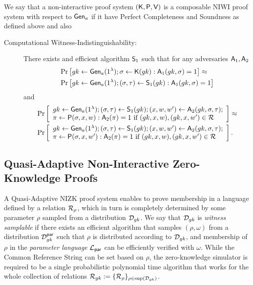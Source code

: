 \begin{definition} We say that a non-interactive proof system $(\mathsf{K},\mathsf{P},\mathsf{V})$ is a composable NIWI proof system with respect to $\mathsf{Gen}_a$ if it have Perfect Completeness and Soundness as defined above and also
\begin{description}
\item[Computational Witness-Indistinguishability:] There exists and efficient algorithm $\mathsf{S}_1$ such that for any adversaries $\mathsf{A}_1,\mathsf{A}_2$
\begin{align*}
&\Pr\left[
gk\gets\mathsf{Gen}_a(1^\lambda);\sigma\gets\mathsf{K}(gk):
\mathsf{A}_1(gk,\sigma)=1
\right]\approx\\
&\Pr\left[
gk\gets\mathsf{Gen}_a(1^\lambda);(\sigma,\tau)\gets\mathsf{S}_1(gk):
\mathsf{A}_1(gk,\sigma)=1
\right]
\end{align*}
and
\begin{align*}
&\Pr\left[
\begin{array}{l}
gk\gets\mathsf{Gen}_a(1^\lambda);(\sigma,\tau)\gets\mathsf{S}_1(gk);(x,w,w')\gets\mathsf{A}_2(gk,\sigma,\tau);\\
\pi\gets\mathsf{P}(\sigma,x,w):\mathsf{A}_2(\pi)=1\text{ if }(gk,x,w),(gk,x,w')\in\mathcal{R}
\end{array}
\right]\approx\\
&\Pr\left[
\begin{array}{l}
gk\gets\mathsf{Gen}_a(1^\lambda);(\sigma,\tau)\gets\mathsf{S}_1(gk);(x,w,w')\gets\mathsf{A}_2(gk,\sigma,\tau);\\
\pi\gets\mathsf{P}(\sigma,x,w'):\mathsf{A}_2(\pi)=1\text{ if }(gk,x,w),(gk,x,w')\in\mathcal{R}
\end{array}
\right].
\end{align*}
\end{description}
\end{definition}

\subsection{Quasi-Adaptive Non-Interactive Zero-Knowledge Proofs}
A Quasi-Adaptive NIZK proof system \cite{AC:JutRoy13} enables
to prove membership in a language defined by a relation $\mathcal{R}_\rho$, which in turn is completely determined by some parameter
$\rho$ sampled from a distribution $\mathcal{D}_{gk}$.
We say that $\mathcal{D}_{gk}$ is \emph{witness samplable} if there exists an efficient
algorithm that samples $(\rho,\omega)$ from a distribution $\mathcal{D}_{gk}^{\mathsf{par}}$ such that $\rho$ is distributed according to $\mathcal{D}_{gk}$, and membership of $\rho$
in the \emph{parameter language} $\mathcal{L}_\mathsf{par}$ can be efficiently verified with $\omega$.
While the Common Reference String can be set based on $\rho$, the zero-knowledge simulator is required to be a single probabilistic polynomial time
algorithm that works for the whole collection of relations $\mathcal{R}_{gk}:=\{\mathcal{R}_\rho\}_{\rho \in \mathrm{sup}(\mathcal{D}_{gk})}$. 


